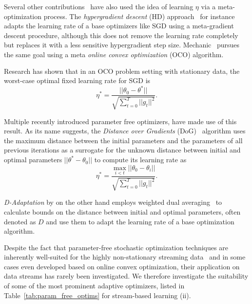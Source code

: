 \documentclass[letterpaper]{article} %
\begin{document}
Several other contributions~\cite{vanervenMetaGradMultipleLearning2016a,baydinOnlineLearningRate2018,cutkoskyMechanicLearningRate2023} have also used the idea of learning $\eta$ via a meta-optimization process.
The \textit{hypergradient descent} (HD) approach~\cite{baydinOnlineLearningRate2018} for instance adapts the learning rate of a base optimizers like SGD using a meta-gradient descent procedure, although this does not remove the learning rate completely but replaces it with a less sensitive hypergradient step size.
Mechanic~\cite{cutkoskyMechanicLearningRate2023} pursues the same goal using a meta \textit{online convex optimization} (OCO) algorithm.

Research has shown that in an OCO problem setting with stationary data, the worst-case optimal fixed learning rate for SGD is
\begin{equation}\label{eq:oco_optimal_lr}
	\eta^* = \frac{||\theta_0 - \theta^*||}{\sqrt{\sum_{t=0}^{T} ||g_t||^2}}.
\end{equation}

Multiple recently introduced parameter free optimizers, have made use of this result.
As its name suggests, the \textit{Distance over Gradients} (DoG)~\cite{ivgiDoGSGDBest2023} algorithm uses the maximum distance between the initial parameters and the parameters of all previous iterations as a surrogate for the unknown distance between initial and optimal parameters $||\theta^* - \theta_0||$ to compute its learning rate as
\begin{equation}
	\eta^* = \frac{\max_{i<t}||\theta_0 - \theta_i||}{\sqrt{\sum_{t=0}^{T} ||g_t||^2}}.
\end{equation}

\textit{D-Adaptation} by \citet{defazioLearningRateFreeLearningDAdaptation2023a} on the other hand employs weighted dual averaging~\cite{duchiDualAveragingDistributed2012} to calculate bounds on the distance between initial and optimal parameters, often denoted as $D$ and use them to adapt the learning rate of a base optimization algorithm.

Despite the fact that parameter-free stochastic optimization techniques are inherently well-suited for the highly non-stationary streaming data~\cite{schaulNoMorePesky2013} and in some cases even developed based on online convex optimization, their application on data streams has rarely been investigated.
We therefore investigate the suitability of some of the most prominent adaptive optimizers, listed in Table~\ref{tab:param_free_optims} for stream-based learning (ii).
\end{document}
